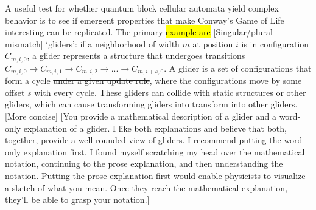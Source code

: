 \documentclass[11pt]{article}
\newcommand{\nicole}[1]{{\color{Green}#1}}
\begin{document}
\begin{multicols}{2}
A useful test for whether quantum block cellular automata yield complex behavior is to see if emergent properties that make Conway's Game of Life interesting can be replicated. The primary \hl{example are} \nicole{[Singular/plural mismatch]} `gliders': if a neighborhood of width $m$ at position $i$ is in configuration $C_{m,i,0}$, a glider represents a structure that undergoes transitions $C_{m,i,0} \to C_{m,i,1} \to C_{m,i,2} \to ... \to C_{m,i+s, 0}$. A glider is a set of configurations that form a cycle\sout{ under a given update rule}, where the configurations move by some offset $s$ with every cycle. These gliders can collide with static structures or other gliders, \sout{which can cause} \nicole{transforming} gliders \nicole{in}to \sout{transform into} other gliders. \nicole{[More concise]}
\nicole{[You provide a mathematical description of a glider and a word-only explanation of a glider. I like both explanations and believe that both, together, provide a well-rounded view of gliders. I recommend putting the word-only explanation first. I found myself scratching my head over the mathematical notation, continuing to the prose explanation, and then understanding the notation. Putting the prose explanation first would enable physicists to visualize a sketch of what you mean. Once they reach the mathematical explanation, they'll be able to grasp your notation.]}


\end{multicols}
\end{document}
